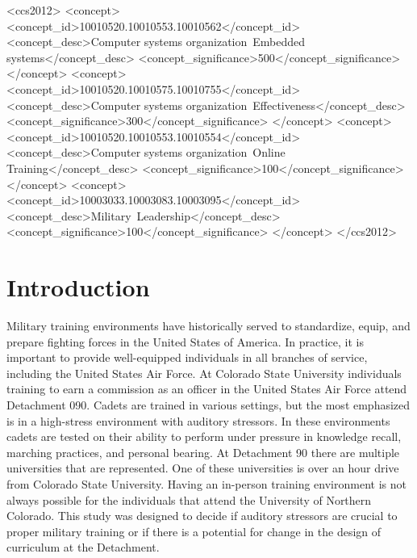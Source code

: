 \documentclass[manuscript,screen,review]{acmart}
\begin{document}
\begin{CCSXML}
<ccs2012>
 <concept>
  <concept_id>10010520.10010553.10010562</concept_id>
  <concept_desc>Computer systems organization~Embedded systems</concept_desc>
  <concept_significance>500</concept_significance>
 </concept>
 <concept>
  <concept_id>10010520.10010575.10010755</concept_id>
  <concept_desc>Computer systems organization~Effectiveness</concept_desc>
  <concept_significance>300</concept_significance>
 </concept>
 <concept>
  <concept_id>10010520.10010553.10010554</concept_id>
  <concept_desc>Computer systems organization~Online Training</concept_desc>
  <concept_significance>100</concept_significance>
 </concept>
 <concept>
  <concept_id>10003033.10003083.10003095</concept_id>
  <concept_desc>Military~Leadership</concept_desc>
  <concept_significance>100</concept_significance>
 </concept>
</ccs2012>
\end{CCSXML}




\maketitle

\section{Introduction}
Military training environments have historically served to standardize, equip, and 
prepare fighting forces in the United States of America. In practice, it is 
important to provide well-equipped individuals in all branches of service, 
including the United States Air Force. At Colorado State University individuals 
training to earn a commission as an officer in the United States Air Force attend 
Detachment 090. Cadets are trained in various settings, but the most emphasized is 
in a high-stress environment with auditory stressors. In these environments cadets 
are tested on their ability to perform under pressure in knowledge recall, marching 
practices, and personal bearing. At Detachment 90 there are multiple universities 
that are represented. One of these universities is over an hour drive from Colorado 
State University. Having an in-person training environment is not always possible for 
the individuals that attend the University of Northern Colorado. This study was 
designed to decide if auditory stressors are crucial to proper military training or 
if there is a potential for change in the design of curriculum at the Detachment.  
\end{document}
